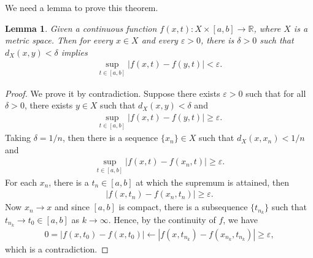 \documentclass[11pt]{book}
\newtheorem{lemma}{Lemma}[chapter]
\theoremstyle{definition}
\numberwithin{equation}{chapter}
\begin{document}
\medskip

We need a lemma to prove this theorem.

\medskip

\begin{lemma}\label{lemma_73}
Given a continuous function $f(x,t): X \times [a,b] \to \mathbb{R}$, where $X$ is a metric space. Then for every $x \in X$ and every $\varepsilon > 0$, there is $\delta > 0$ such that $d_X(x,y) < \delta$ implies
\begin{align*}
    \sup_{t\in[a,b]} \left|f(x,t) - f(y,t)\right| < \varepsilon.
\end{align*}
\end{lemma}
\begin{proof}
We prove it by contradiction. Suppose there exists $\varepsilon > 0$ such that for all $\delta > 0$, there exists $y \in X$ such that $d_X(x,y) < \delta$ and
\begin{align*}
    \sup_{t\in[a,b]} \left|f(x,t) - f(y,t)\right| \geq \varepsilon.
\end{align*}
Taking $\delta = 1/n$, then there is a sequence $\{x_n\} \in X$ such that $d_X(x,x_n) < 1/n$ and
\begin{align*}
    \sup_{t\in[a,b]} \left|f(x,t) - f(x_n,t)\right| \geq \varepsilon.
\end{align*}
For each $x_n$, there is a $t_n \in [a,b]$ at which the supremum is attained, then
\begin{align*}
    \left|f(x,t_n) - f(x_n,t_n)\right| \geq \varepsilon.
\end{align*}
Now $x_n \to x$ and since $[a,b]$ is compact, there is a subsequence $\{t_{n_k}\}$ such that $t_{n_k} \to t_0 \in [a,b]$ as $k \to \infty$. Hence, by the continuity of $f$, we have
\begin{align*}
    0 = \left|f(x,t_0) - f(x,t_0)\right| \leftarrow \left|f(x,t_{n_k}) - f(x_{n_k},t_{n_k})\right| \geq \varepsilon,
\end{align*}
which is a contradiction.
\end{proof}

\medskip
\end{document}
